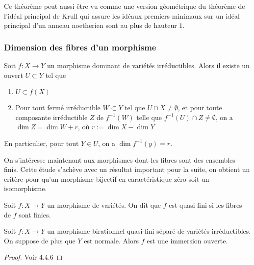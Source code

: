 Ce théorème peut aussi être vu comme une version géométrique du théorème de l'idéal principal de Krull qui assure les idéaux premiers minimaux sur un idéal principal d'un anneau noetherien sont au plus de hauteur $1$.

\subsubsection{Dimension des fibres d'un morphisme}

\begin{thm}\label{dimensionfibres}
Soit $f:X\rightarrow Y$ un morphisme dominant de variétés irréductibles. Alors il existe un ouvert $U\subset Y$ tel que
\begin{enumerate}
\item $U\subset f(X)$
\item Pour tout fermé irréductible $W\subset Y$ tel que $U\cap X\neq \emptyset$, et pour toute composante irréductible $Z$ de $f^{-1}(W)$  telle que $f^{-1}(U)\cap Z\neq \emptyset$, on a $\dim Z=\dim W + r$, où $r:=\dim X -\dim Y$
\end{enumerate}
En particulier, pour tout $Y\in U$, on a $\dim f^{-1}(y)=r.$
\end{thm}

On s'intéresse maintenant aux morphismes dont les fibres sont des ensembles finis. Cette étude s'achève avec un résultat important pour la suite, on obtient un critère pour qu'un morphisme bijectif en caractéristique zéro soit un isomorphisme. 

\begin{defn}
Soit $f:X \rightarrow Y$ un morphisme de variétés. On dit que $f$ est quasi-fini si les fibres de $f$ sont finies.
\end{defn}

\begin{thm}\label{ZMT}
Soit $f:X\rightarrow Y$ un morphisme birationnel quasi-fini séparé de variétés irréductibles. On suppose de plus que $Y$ est normale. Alors $f$ est une immersion ouverte.
\end{thm}
\begin{proof}
Voir \cite{QingLiu} 4.4.6
\end{proof}

